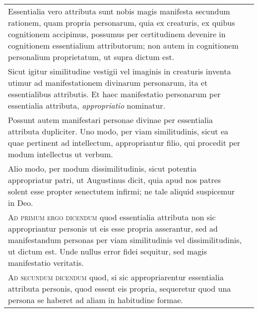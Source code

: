 \documentclass[10pt]{jsarticle} %
\begin{document}
\begin{longtable}{p{21em}p{21em}}
\\


Essentialia vero attributa sunt nobis magis manifesta
secundum rationem, quam propria personarum, quia ex creaturis, ex quibus
cognitionem accipimus, possumus per certitudinem devenire in cognitionem
essentialium attributorum; non autem in cognitionem personalium proprietatum,
ut supra dictum est. 



&

\\

Sicut igitur similitudine vestigii vel imaginis in
creaturis inventa utimur ad manifestationem divinarum personarum, ita et
essentialibus attributis. Et haec manifestatio personarum per essentialia
attributa, \textit{appropriatio} nominatur. 



&

\\



Possunt autem manifestari personae divinae
per essentialia attributa dupliciter. Uno modo, per viam similitudinis, sicut
ea quae pertinent ad intellectum, appropriantur filio, qui procedit per modum
intellectus ut verbum. 




&

\\


Alio modo, per modum dissimilitudinis, sicut potentia
appropriatur patri, ut Augustinus dicit, quia apud nos patres solent esse
propter senectutem infirmi; ne tale aliquid suspicemur in Deo.


&

\\


\textsc{Ad primum ergo dicendum} quod essentialia attributa non sic appropriantur
personis ut eis esse propria asserantur, sed ad manifestandum personas per viam
similitudinis vel dissimilitudinis, ut dictum est. Unde nullus error fidei
sequitur, sed magis manifestatio veritatis.


&

\\


\textsc{Ad secundum dicendum} quod, si sic appropriarentur essentialia attributa
personis, quod essent eis propria, sequeretur quod una persona se haberet ad
aliam in habitudine formae. 




\end{longtable}
\end{document}
